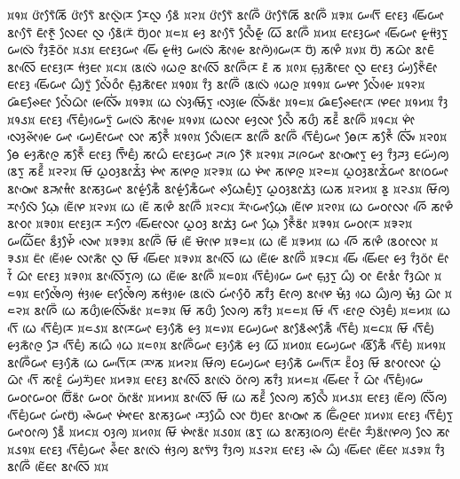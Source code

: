 \noindent
᰿᱁᰿ ᰂᰦᰮᰛᰧᰶᰕᰩ ᰂᰦᰮᰛᰧᰶ ᰣᰦᰜᰬᰮᰌᰨ ᰌᰧᰜᰬ ᰣᰧᰵᰶ ᰿᱂᰿ ᰂᰦᰮᰛᰧᰶ ᰣᰦᰍᰩᰮ ᰂᰦᰮᰛᰧᰶᰕᰩ ᰣᰦᰍᰩᰮ ᰿᱃᰿ ᰠᰛᰩᰵ ᰀᰦᰚᰫ ᰀᰤᰩᰵᰠᰦ ᰣᰦᰛᰧᰵᰶ ᰀᰦᰳᰉᰬᰳ ᰜᰧᰀᰦ ᰜᰬ ᰣᰧᰵᰶᰌᰨᰮ ᰗᰪᰮᰓᰦ ᰿᱄᰿ ᰡᰫ ᰣᰦᰛᰧᰵᰶ ᰜᰧᰰᰶᰡᰬᰳ ᰃᰩ ᰣᰦᰍᰩᰮ ᰿᱅᰿ ᰀᰦᰚᰫᰠᰦ ᰀᰤᰩᰵᰠᰦ ᰡᰬᰙᰫᰮᰛᰬ ᰠᰜᰨᰮ ᰅᰫᰰᰌᰬᰳᰓᰦᰮ ᰿᱆᰿ ᰀᰦᰚᰫᰠᰦ ᰀᰤᰩᰵ ᰡᰬᰙᰫᰮ ᰠᰜᰨᰮ ᰕᰦᰳᰡᰴ ᰣᰦᰍᰪᰮᰠᰴᰌᰨ ᰗᰪᰮ ᰕᰋᰨᰰ ᰿᱇᰿ ᰗᰪᰮ ᰕᰃᰦᰳ ᰣᰦᰀᰶ ᰣᰦᰜᰩᰵ ᰀᰦᰚᰫᰌᰨ ᰙᰫᰭᰀᰦ ᰿᱈᰿ ᰣᰨᰜᰨᰮ ᰃᰴᰍᰬ ᰣᰦᰜᰩᰵ ᰣᰦᰍᰩᰮᰌᰨ ᰚᰶ ᰕ ᰿᱉᰿ ᰀ᰷ᰥᰫᰕᰦᰳᰀᰦ ᰜᰬ ᰀᰦᰚᰫ ᰠᰪᰭᰉᰧᰮᰶᰀᰦᰳ ᰀᰦᰚᰫ ᰀᰤᰩᰵᰠᰦ ᰃᰪᰰᰛᰬᰮ ᰜᰧᰭᰶᰓᰦᰰ ᰀ᰷ᰥᰫᰳᰕᰦᰳᰀᰦ ᰿᱁᱀᰿ ᰅᰫᰰ ᰣᰦᰍᰩᰮ ᰣᰨᰜᰨᰮ ᰃᰴᰍᰬ ᰿᱁᱁᰿ ᰠᰋᰦ ᰜᰧᰭᰶᰡᰴ ᰿᱁᱂᰿ ᰘᰶᰀᰊᰧᰀᰦ ᰜᰧᰭᰶᰃᰦᰳ ᰡᰨᰜᰤᰩᰭ ᰿᱁᱃᰿ ᰃᰨ ᰜᰫᰭᰝᰥᰩᰵᰛᰬ ᰜᰫᰵᰡᰨ ᰜᰤᰩᰭᰣᰦᰮ ᰿᱁᱄᰿ ᰘᰶᰀᰊᰧᰀᰦᰌᰨ ᰋᰨᰀᰦ ᰿᱁᱅᰿ ᰅᰫᰰ ᰿᱁᱆᰿ ᰀᰦᰚᰫ ᰛᰩᰵᰀᰪᰱᰠᰴᰛᰬᰮ ᰠᰜᰨᰮ ᰕᰦᰳᰡᰴ ᰿᱁᱇᰿ ᰃᰨᰜᰦ ᰡᰫᰜᰦ ᰜᰧᰰᰶ ᰕᰂᰪᰰ ᰕᰚᰰᰶ ᰣᰦᰍᰩᰮ ᰿᱁᱈᰿ ᰋᰦᰯ ᰜᰫᰵᰊᰦᰲᰡᰴ ᰠᰦ ᰠᰪᰵᰀᰦᰳᰠᰦ ᰜᰦ ᰕᰉᰧᰰᰶ ᰿᱁᱉᰿ ᰜᰧᰰᰀᰨᰌᰨ ᰣᰦᰍᰩᰮ ᰣᰦᰍᰩᰮ ᰛᰩᰵᰀᰪᰱᰠᰦ ᰟᰧᰌᰨ ᰕᰉᰧᰰᰶ ᰜᰤᰩᰭ ᰿᱂᱀᰿ ᰟᰧ ᰡᰫᰕᰦᰳᰍᰬ ᰕᰉᰧᰰᰶ ᰀᰦᰚᰫ ᰛᰤᰩᰳᰀᰪᰱ ᰕᰦᰃᰰ ᰀᰦᰚᰫᰠᰦ ᰎᰍᰨ ᰉᰧᰶ ᰿᱂᱁᰿ ᰎᰍᰨᰠᰦ ᰣᰦᰓᰥᰤᰦᰵᰛᰬ ᰡᰫ ᰅᰫᰰᰎᰫ ᰀᰠᰪᰮᰍᰪ ᰣᰨᰛᰬ ᰕᰚᰰᰶ ᰿᱂᱂᰿ ᰝᰩ ᰃᰬᰓᰫᰣᰦᰇᰫᰭᰶ ᰋᰤᰦᰭ ᰕᰋᰨᰍᰬ ᰿᱂᱃᰿ ᰃᰨ ᰋᰤᰦᰭ ᰕᰋᰨᰍᰬ ᰿᱂᱄᰿ ᰃᰬᰓᰫᰣᰦᰇᰭᰶᰠᰦ ᰣᰦᰓᰨᰠᰦ ᰣᰦᰓᰥᰤᰦᰵ ᰣᰎᰥᰦᰙᰦᰱ ᰣᰦᰕᰫᰠᰦ ᰣᰦᰡᰬᰭᰕᰧᰳᰶ ᰣᰦᰡᰬᰭᰕᰧᰳᰶᰠᰦ ᰊᰃᰥᰧᰀᰪᰱᰛᰬ ᰃᰬᰓᰫᰣᰦᰇᰫᰭ ᰃᰨᰕ ᰿᱂᱅᰿ ᰣᰬ ᰿᱂᱆᰿ ᰝᰩᰍᰪ ᰌᰦᰜᰧᰵᰶ ᰃ᰷ᰥᰧ ᰀᰨᰲᰋᰨ ᰿᱂᱇᰿ ᰃᰨ ᰀᰨᰲ ᰕᰋᰨᰰ ᰣᰦᰍᰩᰮ ᰿᱂᱈᰿ ᰌᰦᰮᰠᰦᰵᰃ᰷ᰥᰧ ᰀᰨᰲᰋᰨ ᰿᱂᱉᰿ ᰃᰨ ᰠᰓᰦᰜᰦ ᰍᰩᰵ ᰕᰦᰋᰰ ᰣᰦᰆᰦ ᰿᱃᱀᰿ ᰀᰦᰚᰫᰌᰨ ᰌᰔᰧᰵ ᰀᰤᰩᰵᰀᰦᰜᰦ ᰃᰬᰓᰫ ᰣᰦᰇᰫᰭ ᰠᰦ ᰃ᰷ᰥᰧ ᰉᰧᰰᰶᰣᰦᰮ ᰿᱃᱁᰿ ᰠᰓᰦᰌᰨ ᰿᱃᱂᰿ ᰠᰃᰩᰲᰀᰦ ᰣᰫᰰᰋᰧᰭᰶ ᰜᰤᰦᰵ ᰿᱃᱃᰿ ᰣᰦᰍᰩᰮ ᰝᰩ ᰀᰨᰲ ᰝᰦᰳᰋᰨ ᰿᱃᱄᰿ ᰃᰨ ᰀᰨᰲ ᰿᱃᱅᰿ ᰃᰨ ᰍᰩᰵ ᰕᰋᰨᰰ ᰣᰨᰓᰦᰜᰦ ᰿᱃᱆᰿ ᰀᰦᰮ ᰀᰨᰲᰡᰴ ᰜᰦᰕᰦᰳ ᰜᰬ ᰝᰩ ᰀᰤᰩᰵᰀᰦ ᰿᱃᱇᰿ ᰣᰦᰜᰩᰵ ᰃᰨ ᰀᰨᰲᰡᰨ ᰣᰦᰍᰩᰮ ᰿᱃᱈᰿ ᰀᰤᰩᰵ ᰀᰤᰩᰵᰀᰦ ᰡᰫ ᰅᰫᰰᰓᰦᰮ ᰀᰦᰮ ᰅᰭᰶ ᰃᰦᰳ ᰀᰦᰚᰫ ᰿᱃᱉᰿ ᰣᰦᰜᰩᰵᰛᰬᰍᰪ ᰃᰨ ᰀᰨᰲᰡᰨ ᰣᰦᰍᰩᰮ ᰿᱄᱀᰿ ᰛᰩᰵᰀᰪᰱᰠᰴ ᰠᰦ ᰀ᰷ᰥᰫᰛᰬ ᰃᰪᰰ ᰆᰦ ᰀᰦᰳᰣᰦᰱ ᰅᰫᰰᰃᰦᰳ ᰿᱄᱁᰿ ᰀᰦᰒᰧᰭᰶᰍᰪ ᰙᰫᰭᰡᰴ ᰀᰦᰒᰧᰭᰶᰍᰪ ᰕᰙᰫᰭᰡᰴ ᰣᰨᰜᰨᰮ ᰠᰦᰭᰆᰧᰵᰶ ᰕᰅᰫᰰ ᰀᰦᰳᰍᰪ ᰣᰦᰋᰨᰵ ᰝᰥᰫᰱ ᰃᰴ ᰃᰪᰰᰍᰪ ᰝᰥᰫᰱ ᰃᰦᰳ ᰿᱄᱂᰿ ᰣᰦᰍᰩᰮ ᰃᰨ ᰕᰂᰪᰰᰡᰨᰜᰤᰩᰭᰣᰦᰮ ᰿᱄᱃᰿ ᰝᰩ ᰕᰂᰪᰰ ᰜᰧᰍᰪ ᰕᰅᰫᰰ ᰿᱄᱄᰿ ᰝᰩ ᰛᰩᰵ ᰚᰦᰵᰍᰬ ᰜᰫᰮᰀᰪᰱ ᰿᱄᱅᰿ ᰃᰨ ᰛᰩᰵ ᰃᰨ ᰛᰩᰵᰀᰪᰱᰌᰨ ᰿᱄᱆᰿ ᰣᰦᰌᰨᰠᰦ ᰀᰫᰕᰧᰵᰶ ᰡᰫ ᰿᱄᱇᰿ ᰀᰠᰪᰠᰦ ᰣᰦᰣᰧᰶᰊᰦᰕᰧᰳᰶ ᰛᰩᰵᰀᰪᰱ ᰿᱄᱈᰿ ᰝᰩ ᰛᰩᰵᰀᰪᰱ ᰡᰫᰕᰦᰳᰍᰬ ᰎᰧ ᰛᰩᰵᰀᰪᰱ ᰕᰃᰨᰰ ᰃᰴ ᰿᱄᱉᰿ ᰣᰦᰍᰩᰮᰠᰦ ᰀᰫᰕᰧᰵᰶ ᰡᰫ ᰃᰩ ᰿᱅᱀᰿ ᰀᰠᰪᰠᰦ ᰣᰩᰵᰕᰧᰳᰶ ᰛᰩᰵᰀᰪᰱ ᰿᱅᱁᰿ ᰣᰦᰍᰩᰮᰠᰦ ᰀᰫᰕᰧᰵᰶ ᰃᰨ ᰠᰛᰩᰵᰌᰨ ᰌᰤᰨᰕ ᰿᱅᱂᰿ ᰝᰩᰍᰪ ᰀᰠᰪᰠᰦ ᰀᰫᰕᰧᰵᰶ ᰠᰛᰩᰵᰌᰨ ᰚᰮᰶᰓᰫ ᰝᰩ ᰣᰦᰆᰦᰜᰦ ᰃᰬᰭ ᰃᰦᰳ ᰛᰩᰵ ᰕᰦᰚᰬᰯ ᰠᰪᰭᰌᰪᰮᰀᰦ ᰿᱅᱃᰿ ᰀᰦᰚᰫ ᰣᰦᰜᰩᰵ ᰣᰦᰜᰨᰮ ᰓᰦᰮᰍᰪ ᰕᰅᰫᰰ ᰿᱅᱄᰿ ᰀᰤᰩᰵᰀᰦ ᰅᰭᰶ ᰃᰦᰳ ᰛᰩᰵᰀᰪᰱᰠᰴ ᰠᰓᰦᰠᰓᰦ ᰗᰩᰮᰣᰦᰮ ᰠᰓᰦ ᰓᰥᰦᰮᰣᰦᰮ ᰿᱅᱅᰿ ᰣᰦᰜᰩᰵ ᰝᰩ ᰃᰨ ᰕᰚᰰᰶ ᰜᰧᰍᰪ ᰕᰜᰧᰰᰶ ᰿᱅᱆᰿ ᰀᰦᰚᰫ ᰀᰨᰲᰍᰪ ᰜᰩᰮᰍᰪ ᰛᰩᰵᰀᰪᰱᰠᰦ ᰠᰦᰭᰗᰪᰮ ᰊᰤᰵᰶᰠᰦ ᰋᰤᰦᰭᰀᰦ ᰣᰦᰕᰫᰠᰦ ᰌᰫᰵᰃᰧᰳᰶ ᰜᰦ ᰗᰪᰮᰀᰦ ᰣᰦᰓᰥᰤᰦᰵ ᰕ ᰀᰤᰩᰯᰍᰬᰀᰦ ᰿᱅᱇᰿ ᰀᰦᰚᰫ ᰛᰩᰵᰀᰪᰱᰛᰬ ᰠᰦᰓᰦᰍᰪ ᰣᰧᰳᰶ ᰿᱅᱈᰿ ᰆᰫᰍᰪ ᰿᱅᱉᰿ ᰝᰩ ᰋᰤᰦᰭᰣᰦᰮ ᰿᱆᱀᰿ ᰣᰨᰛᰬ ᰃᰨ ᰣᰦᰕᰫᰓᰨᰍᰪ ᰀᰦᰮᰀᰦᰮ ᰌᰪᰰᰣᰦᰮᰋᰨᰍᰪ ᰜᰧ ᰕᰦ ᰿᱆᱁᰿ ᰀᰦᰚᰫ ᰛᰩᰵᰀᰪᰱᰠᰦ ᰊᰰᰶᰀᰦ ᰣᰦᰜᰨᰮ ᰙᰫᰭᰍᰪ ᰣᰦᰛᰤᰫᰮ ᰅᰫᰰᰍᰪ ᰿᱆᱂᰿ ᰀᰦᰚᰫ ᰊᰤᰵᰶ ᰃᰪᰰ ᰀᰤᰩᰵᰀᰦ ᰀᰨᰲᰀᰦ ᰿᱆᱃᰿ ᰅᰫᰰ ᰣᰦᰍᰩᰮ ᰀᰨᰲᰀᰦ ᰣᰦᰜᰩᰵ ᰿᰿

\noindent

\noindent
\bye
\noindent
